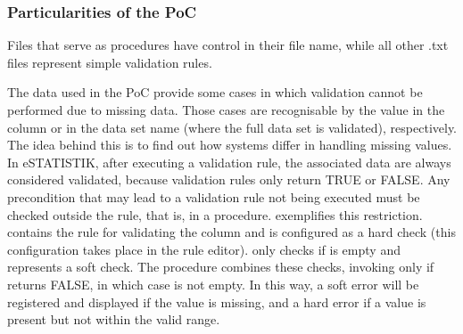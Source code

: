 \subsubsection{Particularities of the PoC}

Files that serve as procedures have control in their file name, while all other .txt files represent simple validation rules.


The data used in the PoC provide some cases in which validation cannot be performed due to missing data. Those cases are recognisable by the value  in the column  or in the data set name (where the full data set is validated), respectively. The idea behind this is to find out how systems differ in handling missing values. In eSTATISTIK, after executing a validation rule, the associated data are always considered validated, because validation rules only return TRUE or FALSE. Any precondition that may lead to a validation rule not being executed must be checked outside the rule, that is, in a procedure.
 exemplifies this restriction.  contains the rule for validating the column   and is configured as a hard check (this configuration takes place in the rule editor).  only checks if  is empty and represents a soft check. The procedure  combines these checks, invoking  only if  returns FALSE, in which case  is not empty. In this way, a soft error will be registered and displayed if the value is missing, and a hard error if a value is present but not within the valid range.



